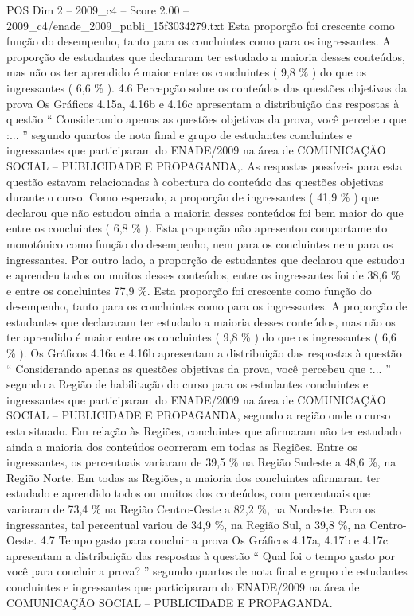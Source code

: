 \begin{textsample}{POS Dim 2 – 2009\_c4 – Score 2.00 – 2009\_c4/enade\_2009\_publi\_15f3034279.txt}
Esta proporção foi crescente como função do desempenho, tanto para os concluintes como para os ingressantes.
A proporção de estudantes que declararam ter estudado a maioria desses conteúdos, mas não os ter aprendido é maior entre os concluintes ( 9,8 \% ) do que os ingressantes ( 6,6 \% ). 4.6 Percepção sobre os conteúdos das questões objetivas da prova Os Gráficos 4.15a, 4.16b e 4.16c apresentam a distribuição das respostas à questão “ Considerando apenas as questões objetivas da prova, você percebeu que :... ” segundo quartos de nota final e grupo de estudantes concluintes e ingressantes que participaram do ENADE/2009 na área de COMUNICAÇÃO SOCIAL – PUBLICIDADE E PROPAGANDA,.
As respostas possíveis para esta questão estavam relacionadas à cobertura do conteúdo das questões objetivas durante o curso.
Como esperado, a proporção de ingressantes ( 41,9 \% ) que declarou que não estudou ainda a maioria desses conteúdos foi bem maior do que entre os concluintes ( 6,8 \% ).
Esta proporção não apresentou comportamento monotônico como função do desempenho, nem para os concluintes nem para os ingressantes.
Por outro lado, a proporção de estudantes que declarou que estudou e aprendeu todos ou muitos desses conteúdos, entre os ingressantes foi de 38,6 \% e entre os concluintes 77,9 \%.
Esta proporção foi crescente como função do desempenho, tanto para os concluintes como para os ingressantes.
A proporção de estudantes que declararam ter estudado a maioria desses conteúdos, mas não os ter aprendido é maior entre os concluintes ( 9,8 \% ) do que os ingressantes ( 6,6 \% ).
Os Gráficos 4.16a e 4.16b apresentam a distribuição das respostas à questão “ Considerando apenas as questões objetivas da prova, você percebeu que :... ” segundo a Região de habilitação do curso para os estudantes concluintes e ingressantes que participaram do ENADE/2009 na área de COMUNICAÇÃO SOCIAL – PUBLICIDADE E PROPAGANDA, segundo a região onde o curso esta situado.
Em relação às Regiões, concluintes que afirmaram não ter estudado ainda a maioria dos conteúdos ocorreram em todas as Regiões.
Entre os ingressantes, os percentuais variaram de 39,5 \% na Região Sudeste a 48,6 \%, na Região Norte.
Em todas as Regiões, a maioria dos concluintes afirmaram ter estudado e aprendido todos ou muitos dos conteúdos, com percentuais que variaram de 73,4 \% na Região Centro-Oeste a 82,2 \%, na Nordeste.
Para os ingressantes, tal percentual variou de 34,9 \%, na Região Sul, a 39,8 \%, na Centro-Oeste. 4.7 Tempo gasto para concluir a prova Os Gráficos 4.17a, 4.17b e 4.17c apresentam a distribuição das respostas à questão “ Qual foi o tempo gasto por você para concluir a prova? ” segundo quartos de nota final e grupo de estudantes concluintes e ingressantes que participaram do ENADE/2009 na área de COMUNICAÇÃO SOCIAL – PUBLICIDADE E PROPAGANDA.

\end{textsample}
